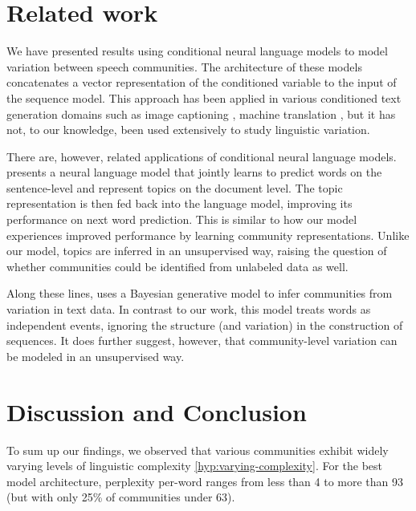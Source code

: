 \documentclass[11pt]{article}
\newcommand\jp[1]{\todo[backgroundcolor=blue!10]{JP: #1}}
\begin{document}
\section{Related work}\label{sec:related-work}

We have presented results using conditional neural language models
to model variation between speech communities.
The architecture of these models concatenates a vector representation
of the conditioned variable to the input of the sequence model.
This approach has been applied in various conditioned text generation domains such as 
image captioning \citep{Vinyals2015}, machine translation \citep{Kalchbrenner2013},
but it has not, to our knowledge, been used extensively to study linguistic variation.

There are, however, related applications of conditional neural language models.
\citet{Lau2017a} presents a neural language model that jointly learns to predict
words on the sentence-level and represent topics on the document level.
The topic representation is then fed back into the language model, 
improving its performance on next word prediction.
This is similar to how our model experiences improved performance
by learning community representations. 
Unlike our model, topics are inferred in an unsupervised way, 
raising the question of whether communities could be identified from 
unlabeled data as well.

Along these lines, \citet{OConnor2010} uses a Bayesian generative
model to infer communities from variation in text data.  In contrast
to our work, this model treats words as independent events, ignoring
the structure (and variation) in the construction of sequences.  It
does further suggest, however, that community-level variation can be
modeled in an unsupervised way.

\section{Discussion and Conclusion}\label{sec:discussion-conclusion}


To sum up our findings, 
we observed that various communities exhibit widely varying levels of
linguistic complexity \ref{hyp:varying-complexity}. For the best model architecture,
perplexity per-word ranges from less than \num{4} to more than \num{93} 
(but with only 25\% of communities under 63).
\end{document}
